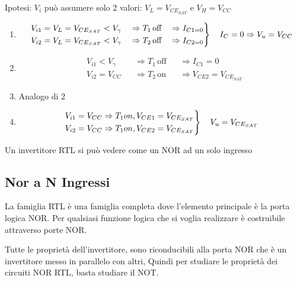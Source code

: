 \documentclass{article}
\begin{document}
Ipotesi: $V_i$ può assumere solo 2 valori: $V_L = V_{CE_{SAT}}$ e $V_H = V_{CC}$

\begin{enumerate}
    \item
        \[
            \begin{rcases}
                \begin{aligned}
                &V_{i1} = V_L = V_{CE_{SAT}} < V_\gamma &&\Rightarrow T_1 \,\text{off} &&\Rightarrow I_{C1 = 0}\\
                &V_{i2} = V_L = V_{CE_{SAT}} < V_\gamma &&\Rightarrow T_2 \,\text{off} &&\Rightarrow I_{C2 = 0}
                \end{aligned}
            \end{rcases} \quad I_C = 0 \Rightarrow V_u = V_{CC}
        \]
    \item
        \[
            \begin{aligned}
                &V_{i1} < V_\gamma &&\Rightarrow T_1 \,\text{off} &&\Rightarrow I_{C1} = 0\\
                &V_{i2} = V_{CC} &&\Rightarrow T_2 \,\text{on} &&\Rightarrow V_{CE2} = V_{CE_{SAT}}
            \end{aligned}
        \]

    \item Analogo di \textcircled{2}
    \item
        \[
            \begin{rcases}
                V_{i1} = V_{CC} \Rightarrow T_1 on, V_{CE1} = V_{CE_{SAT}}\\
                V_{i2} = V_{CC} \Rightarrow T_1 on, V_{CE2} = V_{CE_{SAT}}
            \end{rcases} \quad V_u = V_{CE_{SAT}}
        \]
\end{enumerate}

Un invertitore RTL si può vedere come un NOR ad un solo ingresso

\subsection{Nor a N Ingressi}

La famiglia RTL è una famiglia completa dove l'elemento principale è la porta logica NOR. Per qualsiasi funzione logica che si voglia realizzare è costruibile attraverso porte NOR.

Tutte le proprietà dell'invertitore, sono riconducibili alla porta NOR che è un invertitore messo in parallelo con altri, Quindi per studiare le proprietà dei circuiti NOR RTL, basta studiare il NOT.
\end{document}
